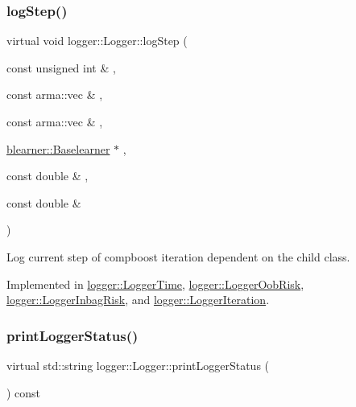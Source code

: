 \subsubsection{\texorpdfstring{log\+Step()}{logStep()}}
{\footnotesize\ttfamily virtual void logger\+::\+Logger\+::log\+Step (\begin{DoxyParamCaption}\item[{const unsigned int \&}]{,  }\item[{const arma\+::vec \&}]{,  }\item[{const arma\+::vec \&}]{,  }\item[{\mbox{\hyperlink{classblearner_1_1_baselearner}{blearner\+::\+Baselearner}} $\ast$}]{,  }\item[{const double \&}]{,  }\item[{const double \&}]{ }\end{DoxyParamCaption})\hspace{0.3cm}{\ttfamily [pure virtual]}}



Log current step of compboost iteration dependent on the child class. 



Implemented in \mbox{\hyperlink{classlogger_1_1_logger_time_aec35d7d3c780043ff2b7c9f71712abbc}{logger\+::\+Logger\+Time}}, \mbox{\hyperlink{classlogger_1_1_logger_oob_risk_a4b0ea670a7970bca31037efab99cc06a}{logger\+::\+Logger\+Oob\+Risk}}, \mbox{\hyperlink{classlogger_1_1_logger_inbag_risk_aa7cb90600de663c51feaaf8a0715a0f9}{logger\+::\+Logger\+Inbag\+Risk}}, and \mbox{\hyperlink{classlogger_1_1_logger_iteration_a155e7fd8c8130211f54804c5ff3a054b}{logger\+::\+Logger\+Iteration}}.

\mbox{\label{classlogger_1_1_logger_abad818a7e8053ca84cb267e883b5e377}} 
\subsubsection{\texorpdfstring{print\+Logger\+Status()}{printLoggerStatus()}}
{\footnotesize\ttfamily virtual std\+::string logger\+::\+Logger\+::print\+Logger\+Status (\begin{DoxyParamCaption}{ }\end{DoxyParamCaption}) const\hspace{0.3cm}{\ttfamily [pure virtual]}}



